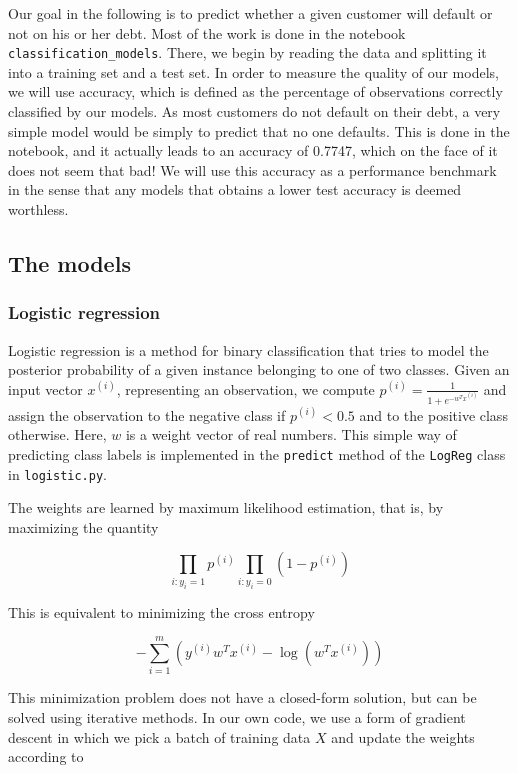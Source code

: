 \documentclass{article}
\begin{document}
Our goal in the following is to predict whether a given customer will default or not on his or her debt. Most of the work is done in the notebook \texttt{classification\_models}. There, we begin by reading the data and splitting it into a training set and a test set. In order to measure the quality of our models, we will use accuracy, which is defined as the percentage of observations correctly classified by our models. As most customers do not default on their debt, a very simple model would be simply to predict that no one defaults. This is done in the notebook, and it actually leads to an accuracy of 0.7747, which on the face of it does not seem that bad! We will use this accuracy as a performance benchmark in the sense that any models that obtains a lower test accuracy is deemed worthless.

\subsection{The models}
\subsubsection{Logistic regression}
Logistic regression is a method for binary classification that tries to model the posterior probability of a given instance belonging to one of two classes. Given an input vector $x^{(i)}$, representing an observation, we compute $p^{(i)} = \frac{1}{1+e^{-w^T x^{(i)}}}$ and assign the observation to the negative class if $p^(i) < 0.5$ and to the positive class otherwise. Here, $w$ is a weight vector of real numbers. This simple way of predicting class labels is implemented in the \texttt{predict} method of the \texttt{LogReg} class in \texttt{logistic.py}.

The weights are learned by maximum likelihood estimation, that is, by maximizing the quantity

\begin{equation}
    \prod_{i: y_i=1}{p^{(i)}}\prod_{i: y_i=0}{(1 - p^{(i)})}
\end{equation}

This is equivalent to minimizing the cross entropy

\begin{equation}
    -\sum_{i=1}^{m}{(y^{(i)} w^T x^{(i)} - \log(w^T x^{(i)}))}
\end{equation}

This minimization problem does not have a closed-form solution, but can be solved using iterative methods. In our own code, we use a form of gradient descent in which we pick a batch of training data $X$ and update the weights according to
\end{document}
